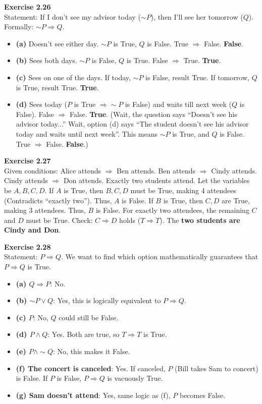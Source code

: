 \documentclass[11pt]{article}
\begin{document}
\vspace{10pt}
\textbf{Exercise 2.26} \\
Statement: If I don't see my advisor today ($\sim P$), then I'll see her tomorrow ($Q$). Formally: $\sim P \Rightarrow Q$.
\begin{itemize}
    \item \textbf{(a)} Doesn't see either day. $\sim P$ is True, $Q$ is False. True $\Rightarrow$ False. \textbf{False}.
    \item \textbf{(b)} Sees both days. $\sim P$ is False, $Q$ is True. False $\Rightarrow$ True. \textbf{True}.
    \item \textbf{(c)} Sees on one of the days. If today, $\sim P$ is False, result True. If tomorrow, $Q$ is True, result True. \textbf{True}.
    \item \textbf{(d)} Sees today ($P$ is True $\Rightarrow \sim P$ is False) and waits till next week ($Q$ is False). False $\Rightarrow$ False. \textbf{True}. (Wait, the question says ``Doesn't see his advisor today...'' Wait, option (d) says ``The student doesn't see his advisor today and waits until next week''. This means $\sim P$ is True, and $Q$ is False. True $\Rightarrow$ False. \textbf{False}.)
\end{itemize}

\vspace{10pt}
\textbf{Exercise 2.27} \\
Given conditions: Alice attends $\Rightarrow$ Ben attends. Ben attends $\Rightarrow$ Cindy attends. Cindy attends $\Rightarrow$ Don attends. Exactly two students attend.
Let the variables be $A, B, C, D$. If $A$ is True, then $B, C, D$ must be True, making 4 attendees (Contradicts ``exactly two''). Thus, $A$ is False. If $B$ is True, then $C, D$ are True, making 3 attendees. Thus, $B$ is False. For exactly two attendees, the remaining $C$ and $D$ must be True. Check: $C \Rightarrow D$ holds ($T \Rightarrow T$). The \textbf{two students are Cindy and Don}.

\vspace{10pt}
\textbf{Exercise 2.28} \\
Statement: $P \Rightarrow Q$. We want to find which option mathematically guarantees that $P \Rightarrow Q$ is True.
\begin{itemize}
    \item \textbf{(a) $Q \Rightarrow P$}: No.
    \item \textbf{(b) $\sim P \vee Q$}: Yes, this is logically equivalent to $P \Rightarrow Q$.
    \item \textbf{(c) $P$}: No, $Q$ could still be False.
    \item \textbf{(d) $P \wedge Q$}: Yes. Both are true, so $T \Rightarrow T$ is True.
    \item \textbf{(e) $P \wedge \sim Q$}: No, this makes it False.
    \item \textbf{(f) The concert is canceled}: Yes. If canceled, $P$ (Bill takes Sam to concert) is False. If $P$ is False, $P \Rightarrow Q$ is vacuously True.
    \item \textbf{(g) Sam doesn't attend}: Yes, same logic as (f), $P$ becomes False.
\end{itemize}
\end{document}

